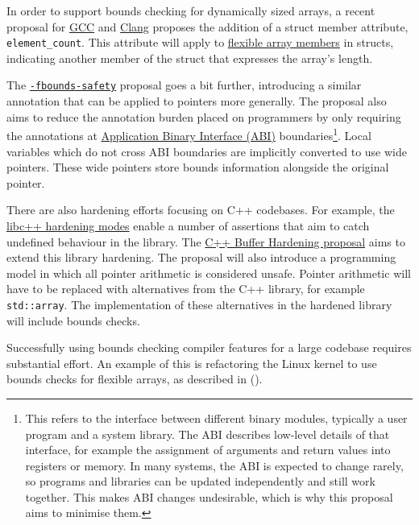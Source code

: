 \documentclass[
  a4paper,
]{report}
\begin{document}
In order to support bounds checking for dynamically sized arrays, a
recent proposal for
\href{https://gcc.gnu.org/bugzilla/show_bug.cgi?id=108896}{GCC} and
\href{https://reviews.llvm.org/D148381}{Clang} proposes the addition of
a struct member attribute, \texttt{element\_count}. This attribute will
apply to
\href{https://en.wikipedia.org/wiki/Flexible_array_member}{flexible
array members} in structs, indicating another member of the struct that
expresses the array's length.

The
\href{https://discourse.llvm.org/t/rfc-enforcing-bounds-safety-in-c-fbounds-safety/70854}{\texttt{-fbounds-safety}}
proposal goes a bit further, introducing a similar annotation that can
be applied to pointers more generally. The proposal also aims to reduce
the annotation burden placed on programmers by only requiring the
annotations at
\href{https://en.wikipedia.org/wiki/Application_binary_interface}{\label{__index_entry_89}{Application
Binary Interface (ABI)}}
boundaries\footnote{This refers to the interface between different
  binary modules, typically a user program and a system library. The ABI
  describes low-level details of that interface, for example the
  assignment of arguments and return values into registers or memory. In
  many systems, the ABI is expected to change rarely, so programs and
  libraries can be updated independently and still work together. This
  makes ABI changes undesirable, which is why this proposal aims to
  minimise them.}. Local variables which do not cross ABI boundaries are
implicitly converted to use wide pointers. These wide pointers store
bounds information alongside the original pointer.

There are also hardening efforts focusing on C++ codebases. For example,
the \href{https://libcxx.llvm.org/Hardening.html}{libc++ hardening
modes} enable a number of assertions that aim to catch undefined
behaviour in the library. The
\href{https://discourse.llvm.org/t/rfc-c-buffer-hardening/65734}{C++
Buffer Hardening proposal} aims to extend this library hardening. The
proposal will also introduce a programming model in which all pointer
arithmetic is considered unsafe. Pointer arithmetic will have to be
replaced with alternatives from the C++ library, for example
\texttt{std::array}. The implementation of these alternatives in the
hardened library will include bounds checks.

Successfully using bounds checking compiler features for a large
codebase requires substantial effort. An example of this is refactoring
the Linux kernel to use bounds checks for flexible arrays, as described
in ().
\end{document}
